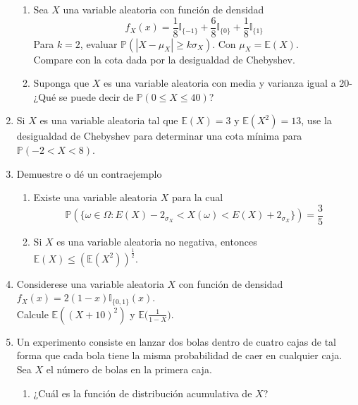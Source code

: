 \documentclass[12pt,a4paper]{report}
\begin{document}
\begin{enumerate}
{\begin{enumerate}
				\item {
					Sea $X$ una variable aleatoria con función de densidad
					\[
					f_X(x) = \frac{1}{8}\mathbb{I}_{\{-1\}} +
					\frac{6}{8}\mathbb{I}_{\{0\}} +
					\frac{1}{8}\mathbb{I}_{\{1\}}
					\]
					Para $k = 2$, evaluar
					$\mathbb{P}(|X-\mu_X| \geq k\sigma_X)$. Con
					$\mu_X = \mathbb{E}(X)$.\\
					Compare con la cota dada por la desigualdad de Chebyshev.
				}

				\item {
					Suponga que $X$ es una variable aleatoria con media y
					varianza igual a 20- ¿Qué se puede decir de
					$\mathbb{P}(0 \leq X \leq 40)$?
				}
			\end{enumerate}
		}

		\item{
			Si $X$ es una variable aleatoria tal que $\mathbb{E}(X) = 3$ y
			$\mathbb{E}(X^2) = 13$, use la desigualdad de Chebyshev para
			determinar una cota mínima para $\mathbb{P}(-2 < X < 8)$.
		}

		\item{
			Demuestre o dé un contraejemplo
			\begin{enumerate}
				\item {
					Existe una variable aleatoria $X$ para la cual
					\[\mathbb{P}(\{\omega \in \Omega : E(X) - 2_{\sigma_X} <
					X(\omega) <
					E(X) + 2_{\sigma_X}\}) = \frac{3}{5}\]
				}

				\item {
					Si $X$ es una variable aleatoria no negativa, entonces
					$\mathbb{E}(X) \leq (\mathbb{E}(X^2))^{\frac{1}{2}}$.
				}
			\end{enumerate}
		}

		\item{
			Considerese una variable aleatoria $X$ con función de densidad
			$f_X(x) = 2(1-x)\mathbb{I}_{\{0, 1\}}(x)$.\\
			Calcule $\mathbb{E}((X+10)^2)$ y
			$\mathbb{E}\Big(\frac{1}{1-X}\Big)$.
		}

		\item{
			Un experimento consiste en lanzar dos bolas dentro de cuatro cajas
			de tal forma que cada bola tiene la misma probabilidad de caer en
			cualquier caja. Sea $X$ el número de bolas en la primera caja.
			\begin{enumerate}
				\item {
					¿Cuál es la función de distribución acumulativa de $X$?
				}


\end{enumerate}}
\end{enumerate}
\end{document}
